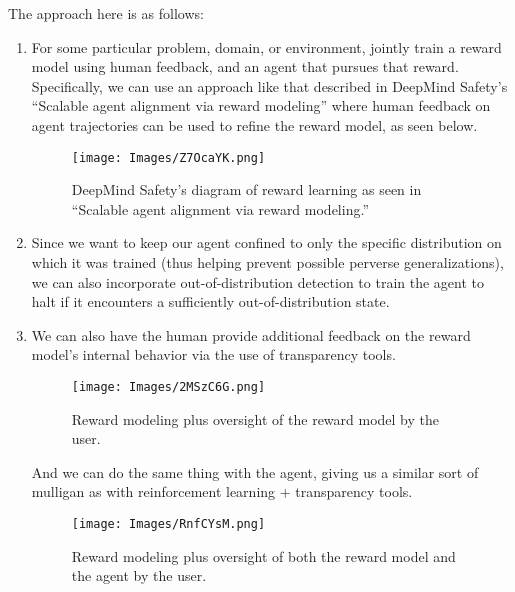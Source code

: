 \documentclass[
  onecolumn,
  natbib,
]{miri-tech-article}
\begin{document}
The approach here is as follows:

\begin{enumerate}
\item For some particular problem, domain, or environment, jointly train a reward model using human feedback, and an agent that pursues that reward. Specifically, we can use an approach like that described in DeepMind Safety's ``Scalable agent alignment via reward modeling'' where human feedback on agent trajectories can be used to refine the reward model, as seen below.\cite{leike}

\vspace{4mm}

\begin{figure}[H]
  \centering
  \texttt{[image: Images/Z7OcaYK.png]}
  \caption{DeepMind Safety's diagram of reward learning as seen in ``Scalable agent alignment via reward modeling.''}
\end{figure}

\vspace{2mm}

\item Since we want to keep our agent confined to only the specific distribution on which it was trained (thus helping prevent possible perverse generalizations), we can also incorporate out-of-distribution detection\cite{out_of_distribution} to train the agent to halt if it encounters a sufficiently out-of-distribution state.

\item We can also have the human provide additional feedback on the reward model's internal behavior via the use of transparency tools.

\vspace{4mm}

\begin{figure}[H]
  \centering
  \texttt{[image: Images/2MSzC6G.png]}
  \caption{Reward modeling plus oversight of the reward model by the user.}
\end{figure}

\vspace{2mm}

\noindent And we can do the same thing with the agent, giving us a similar sort of mulligan as with reinforcement learning + transparency tools.

\vspace{4mm}

\begin{figure}[H]
  \centering
  \texttt{[image: Images/RnfCYsM.png]}
  \caption{Reward modeling plus oversight of both the reward model and the agent by the user.}
\end{figure}
\end{enumerate}
\end{document}
